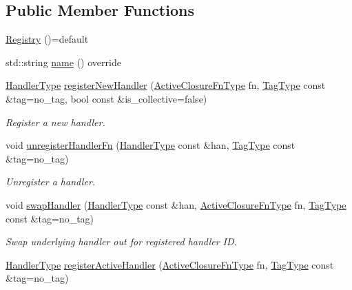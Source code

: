 \subsection*{Public Member Functions}
\begin{DoxyCompactItemize}
\item 
\hyperlink{structvt_1_1registry_1_1_registry_a319ac9c59641bee88d48e825a4840aa2}{Registry} ()=default
\item 
std\+::string \hyperlink{structvt_1_1registry_1_1_registry_a8488eb3ab95e207094617027bb5c75c9}{name} () override
\item 
\hyperlink{namespacevt_af64846b57dfcaf104da3ef6967917573}{Handler\+Type} \hyperlink{structvt_1_1registry_1_1_registry_a2e3b140ef858712eb34deb89623cbbc3}{register\+New\+Handler} (\hyperlink{namespacevt_a2a06c34cafcd511828f16cbf1476b924}{Active\+Closure\+Fn\+Type} fn, \hyperlink{namespacevt_a84ab281dae04a52a4b243d6bf62d0e52}{Tag\+Type} const \&tag=no\+\_\+tag, bool const \&is\+\_\+collective=false)
\begin{DoxyCompactList}\small\item\em Register a new handler. \end{DoxyCompactList}\item 
void \hyperlink{structvt_1_1registry_1_1_registry_adaee9715edeb66b2fc8cd4639288a1cd}{unregister\+Handler\+Fn} (\hyperlink{namespacevt_af64846b57dfcaf104da3ef6967917573}{Handler\+Type} const \&han, \hyperlink{namespacevt_a84ab281dae04a52a4b243d6bf62d0e52}{Tag\+Type} const \&tag=no\+\_\+tag)
\begin{DoxyCompactList}\small\item\em Unregister a handler. \end{DoxyCompactList}\item 
void \hyperlink{structvt_1_1registry_1_1_registry_affe7c413b570120f7ccb0af95d6e9181}{swap\+Handler} (\hyperlink{namespacevt_af64846b57dfcaf104da3ef6967917573}{Handler\+Type} const \&han, \hyperlink{namespacevt_a2a06c34cafcd511828f16cbf1476b924}{Active\+Closure\+Fn\+Type} fn, \hyperlink{namespacevt_a84ab281dae04a52a4b243d6bf62d0e52}{Tag\+Type} const \&tag=no\+\_\+tag)
\begin{DoxyCompactList}\small\item\em Swap underlying handler out for registered handler ID. \end{DoxyCompactList}\item 
\hyperlink{namespacevt_af64846b57dfcaf104da3ef6967917573}{Handler\+Type} \hyperlink{structvt_1_1registry_1_1_registry_ad4fdbf2cfbe4e852c5556435efe4255f}{register\+Active\+Handler} (\hyperlink{namespacevt_a2a06c34cafcd511828f16cbf1476b924}{Active\+Closure\+Fn\+Type} fn, \hyperlink{namespacevt_a84ab281dae04a52a4b243d6bf62d0e52}{Tag\+Type} const \&tag=no\+\_\+tag)

\end{DoxyCompactItemize}
